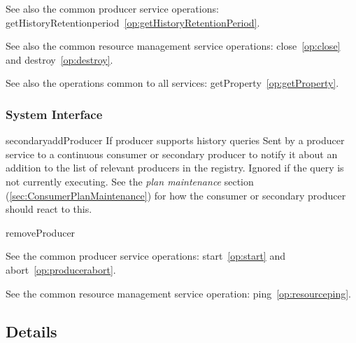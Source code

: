 See also the common producer service operations:
getHistoryRetentionperiod~\ref{op:getHistoryRetentionPeriod}.

See also the common resource management service operations:
close~\ref{op:close} and destroy~\ref{op:destroy}.

See also the operations common to all services:
getProperty~\ref{op:getProperty}.

\subsubsection{System Interface}

\begin{method}{secondary}{addProducer}
 {If producer supports history queries}
\OK
\desc Sent by a producer service to a continuous consumer or secondary producer
to notify it about an
addition to the list of relevant producers in the registry. Ignored if the
query is not currently executing. See the \textit{plan maintenance} section
(\ref{sec:ConsumerPlanMaintenance}) for how the consumer or secondary
producer should react to this.
\end{method}

\begin{method}{removeProducer}
\OK
\end{method}

See  the common producer service operations:
start~\ref{op:start} and abort~\ref{op:producerabort}.

See the common resource management service operation:
ping~\ref{op:resourceping}.

\subsection{Details}
